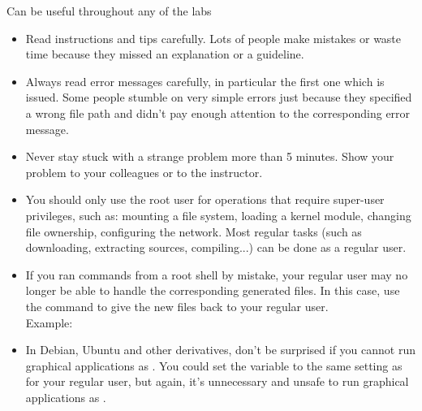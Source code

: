 Can be useful throughout any of the labs

\begin{itemize}

\item Read instructions and tips carefully. Lots of people make
  mistakes or waste time because they missed an explanation or a
  guideline.

\item Always read error messages carefully, in particular the first
  one which is issued. Some people stumble on very simple errors just
  because they specified a wrong file path and didn't pay enough
  attention to the corresponding error message.

\item Never stay stuck with a strange problem more than 5
  minutes. Show your problem to your colleagues or to the instructor.

\item You should only use the root user for operations that require
  super-user privileges, such as: mounting a file system, loading a
  kernel module, changing file ownership, configuring the
  network. Most regular tasks (such as downloading, extracting
  sources, compiling...) can be done as a regular user.

\item If you ran commands from a root shell by mistake, your regular
  user may no longer be able to handle the corresponding generated
  files. In this case, use the  command to give the new
  files back to your regular user.\\
  Example: 

\item In Debian, Ubuntu and other derivatives, don't be surprised if
  you cannot run graphical applications as . You could set the
   variable to the same setting as for your regular user, but
  again, it's unnecessary and unsafe to run graphical applications as
  .

\end{itemize}

